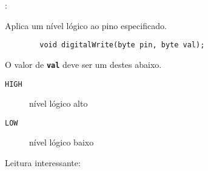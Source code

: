 \begin{frame}[b,fragile]{\insertsection: \insertsubsection}

	Aplica um nível lógico ao pino especificado.
	\begin{verbatim}
		void digitalWrite(byte pin, byte val);
	\end{verbatim}

	O valor de \texttt{\textbf{val}} deve ser um destes abaixo.
	\begin{description}
		\item[\texttt{HIGH}] nível lógico alto
		\item[\texttt{LOW}] nível lógico baixo
	\end{description}

	\vfill
	Leitura interessante: 

\end{frame}

